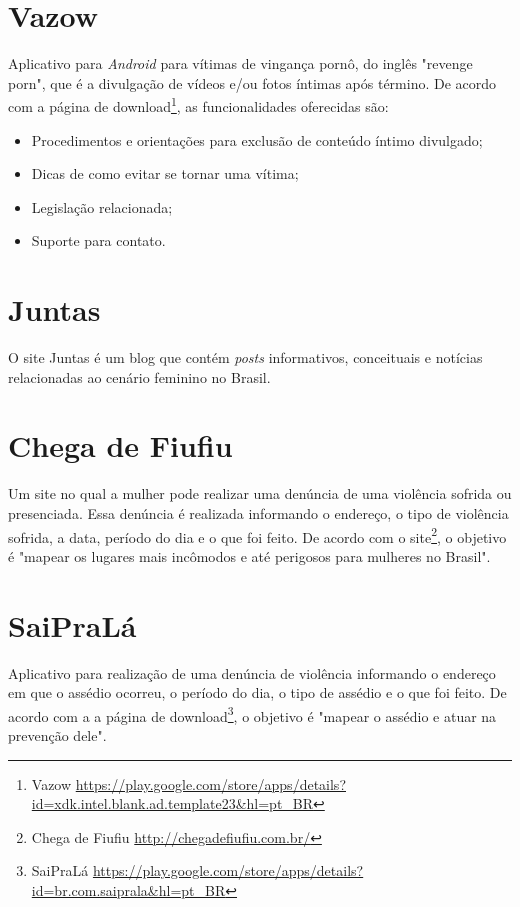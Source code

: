 \section*{Vazow}

Aplicativo para \textit{Android} para vítimas de vingança pornô, do inglês "revenge porn", que é a 
divulgação de vídeos e/ou fotos íntimas após término.
De acordo com a página de download\footnote{Vazow \url{https://play.google.com/store/apps/details?id=xdk.intel.blank.ad.template23&hl=pt_BR}}, as funcionalidades oferecidas são:

\begin{itemize}
	\item Procedimentos e orientações para exclusão de conteúdo íntimo divulgado;
	\item Dicas de como evitar se tornar uma vítima;
	\item Legislação relacionada;
	\item Suporte para contato.
\end{itemize}

\section*{Juntas}

O site Juntas é um blog que contém \textit{posts} informativos, conceituais e notícias 
relacionadas ao cenário feminino no Brasil.

\section*{Chega de Fiufiu}

Um site no qual a mulher pode realizar uma denúncia de uma violência sofrida ou presenciada. 
Essa denúncia é realizada informando o endereço, o tipo de violência sofrida, a data, período do dia e o que foi feito. De acordo com o site\footnote{Chega de Fiufiu \url{http://chegadefiufiu.com.br/}}, o objetivo é "mapear os lugares mais incômodos e até perigosos para mulheres no Brasil".

\section*{SaiPraLá}

Aplicativo para realização de uma denúncia de violência informando o endereço em que o assédio ocorreu, o período do dia, o tipo de assédio e o que foi feito. De acordo com a a página de download\footnote{SaiPraLá \url{https://play.google.com/store/apps/details?id=br.com.saiprala&hl=pt_BR}}, o objetivo é "mapear o assédio e atuar na prevenção dele".

